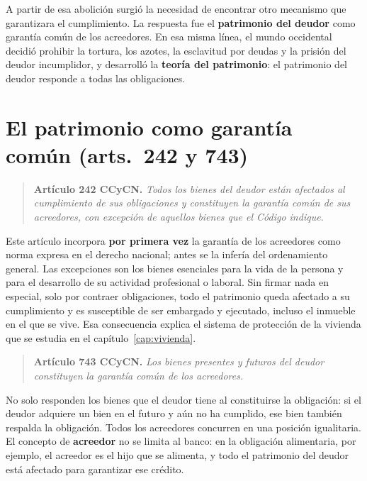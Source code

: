\documentclass[12pt,oneside]{book}
\begin{document}
A partir de esa abolición surgió la necesidad de encontrar otro mecanismo que garantizara el cumplimiento. La respuesta fue el \textbf{patrimonio del deudor} como garantía común de los acreedores. En esa misma línea, el mundo occidental decidió prohibir la tortura, los azotes, la esclavitud por deudas y la prisión del deudor incumplidor, y desarrolló la \textbf{teoría del patrimonio}: el patrimonio del deudor responde a todas las obligaciones.

\section{El patrimonio como garantía común (arts.~242 y 743)}

\begin{quote}
\textbf{Artículo 242 CCyCN.} \textit{Todos los bienes del deudor están afectados al cumplimiento de sus obligaciones y constituyen la garantía común de sus acreedores, con excepción de aquellos bienes que el Código indique.}
\end{quote}

Este artículo incorpora \textbf{por primera vez} la garantía de los acreedores como norma expresa en el derecho nacional; antes se la infería del ordenamiento general. Las excepciones son los bienes esenciales para la vida de la persona y para el desarrollo de su actividad profesional o laboral. Sin firmar nada en especial, solo por contraer obligaciones, todo el patrimonio queda afectado a su cumplimiento y es susceptible de ser embargado y ejecutado, incluso el inmueble en el que se vive. Esa consecuencia explica el sistema de protección de la vivienda que se estudia en el capítulo~\ref{cap:vivienda}.

\begin{quote}
\textbf{Artículo 743 CCyCN.} \textit{Los bienes presentes y futuros del deudor constituyen la garantía común de los acreedores.}
\end{quote}

No solo responden los bienes que el deudor tiene al constituirse la obligación: si el deudor adquiere un bien en el futuro y aún no ha cumplido, ese bien también respalda la obligación. Todos los acreedores concurren en una posición igualitaria. El concepto de \textbf{acreedor} no se limita al banco: en la obligación alimentaria, por ejemplo, el acreedor es el hijo que se alimenta, y todo el patrimonio del deudor está afectado para garantizar ese crédito.
\end{document}
